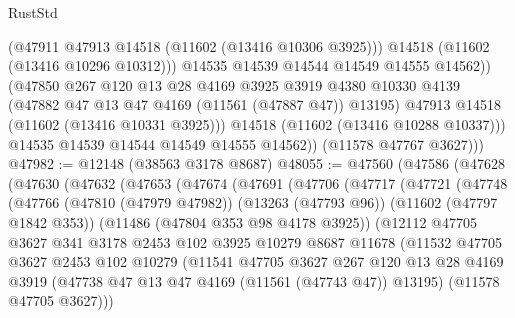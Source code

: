 \begin{lexlean}{RustStd}
\begin{coremodule}
                    (@47911 @47913 @14518 (@11602 (@13416 @10306 @3925)))
                    @14518
                    (@11602 (@13416 @10296 @10312)))
                  @14535
                  @14539
                  @14544
                  @14549
                  @14555
                  @14562))
              (@47850
                @267
                @120
                @13
                @28
                @4169
                @3925
                @3919
                @4380
                @10330
                @4139
                (@47882 @47 @13 @47 @4169 (@11561 (@47887 @47)) @13195)
                @47913
                @14518
                (@11602 (@13416 @10331 @3925)))
              @14518
              (@11602 (@13416 @10288 @10337)))
            @14535
            @14539
            @14544
            @14549
            @14555
            @14562))
        (@11578 @47767 @3627)))
@47982 := @12148 (@38563 @3178 @8687)
@48055 := @47560
    (@47586
      (@47628
        (@47630
          (@47632
            (@47653
              (@47674
                (@47691
                  (@47706
                    (@47717
                      (@47721
                        (@47748
                          (@47766
                            (@47810 (@47979 @47982))
                            (@13263 (@47793 @96))
                            (@11602 (@47797 @1842 @353))
                            (@11486 (@47804 @353 @98 @4178 @3925))
                            (@12112
                              @47705
                              @3627
                              @341
                              @3178
                              @2453
                              @102
                              @3925
                              @10279
                              @8687
                              @11678
                              (@11532
                                @47705
                                @3627
                                @2453
                                @102
                                @10279
                                (@11541
                                  @47705
                                  @3627
                                  @267
                                  @120
                                  @13
                                  @28
                                  @4169
                                  @3919
                                  (@47738 @47 @13 @47 @4169 (@11561 (@47743 @47)) @13195)
                                  (@11578 @47705 @3627)))

\end{coremodule}
\end{lexlean}
